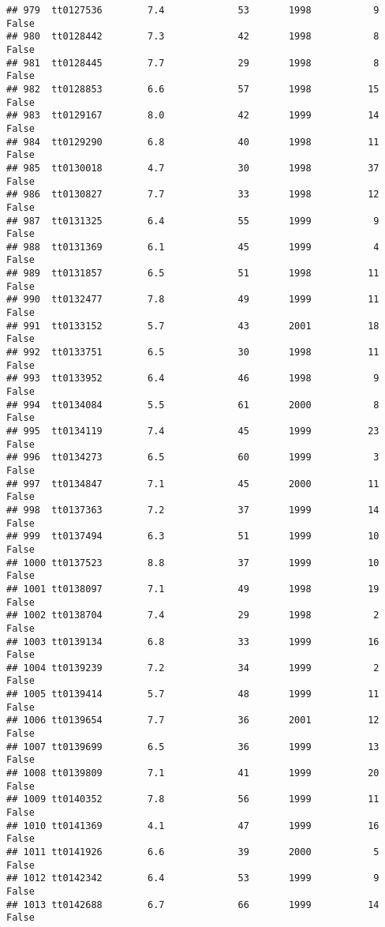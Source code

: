 \documentclass[
]{article}
\begin{document}
\begin{verbatim}
## 979  tt0127536        7.4             53       1998           9   False
## 980  tt0128442        7.3             42       1998           8   False
## 981  tt0128445        7.7             29       1998           8   False
## 982  tt0128853        6.6             57       1998          15   False
## 983  tt0129167        8.0             42       1999          14   False
## 984  tt0129290        6.8             40       1998          11   False
## 985  tt0130018        4.7             30       1998          37   False
## 986  tt0130827        7.7             33       1998          12   False
## 987  tt0131325        6.4             55       1999           9   False
## 988  tt0131369        6.1             45       1999           4   False
## 989  tt0131857        6.5             51       1998          11   False
## 990  tt0132477        7.8             49       1999          11   False
## 991  tt0133152        5.7             43       2001          18   False
## 992  tt0133751        6.5             30       1998          11   False
## 993  tt0133952        6.4             46       1998           9   False
## 994  tt0134084        5.5             61       2000           8   False
## 995  tt0134119        7.4             45       1999          23   False
## 996  tt0134273        6.5             60       1999           3   False
## 997  tt0134847        7.1             45       2000          11   False
## 998  tt0137363        7.2             37       1999          14   False
## 999  tt0137494        6.3             51       1999          10   False
## 1000 tt0137523        8.8             37       1999          10   False
## 1001 tt0138097        7.1             49       1998          19   False
## 1002 tt0138704        7.4             29       1998           2   False
## 1003 tt0139134        6.8             33       1999          16   False
## 1004 tt0139239        7.2             34       1999           2   False
## 1005 tt0139414        5.7             48       1999          11   False
## 1006 tt0139654        7.7             36       2001          12   False
## 1007 tt0139699        6.5             36       1999          13   False
## 1008 tt0139809        7.1             41       1999          20   False
## 1009 tt0140352        7.8             56       1999          11   False
## 1010 tt0141369        4.1             47       1999          16   False
## 1011 tt0141926        6.6             39       2000           5   False
## 1012 tt0142342        6.4             53       1999           9   False
## 1013 tt0142688        6.7             66       1999          14   False

\end{verbatim}
\end{document}
